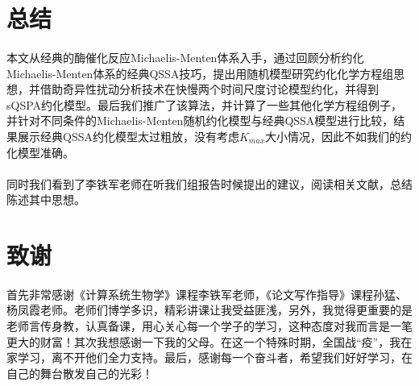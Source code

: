 \documentclass[UTF8]{ctexart}
\begin{document}
	\section{总结}
	\paragraph{}本文从经典的酶催化反应Michaelis-Menten体系入手，通过回顾分析约化Michaelis-Menten体系的经典QSSA技巧，提出用随机模型研究约化化学方程组思想，并借助奇异性扰动分析技术在快慢两个时间尺度讨论模型约化，并得到sQSPA约化模型。最后我们推广了该算法，并计算了一些其他化学方程组例子，并针对不同条件的Michaelis-Menten随机约化模型与经典QSSA模型进行比较，结果展示经典QSSA约化模型太过粗放，没有考虑$K_{max}$大小情况，因此不如我们的约化模型准确。
	\paragraph{}同时我们看到了李铁军老师在听我们组报告时候提出的建议，阅读相关文献，总结陈述其中思想。
	\section{致谢}
	\paragraph{}首先非常感谢《计算系统生物学》课程李铁军老师，《论文写作指导》课程孙猛、杨凤霞老师。老师们博学多识，精彩讲课让我受益匪浅，另外，我觉得更重要的是老师言传身教，认真备课，用心关心每一个学子的学习，这种态度对我而言是一笔更大的财富！其次我想感谢一下我的父母。在这一个特殊时期，全国战“疫”，我在家学习，离不开他们全力支持。最后，感谢每一个奋斗者，希望我们好好学习，在自己的舞台散发自己的光彩！
	
	
\end{document}
